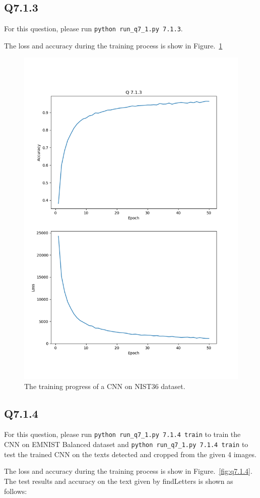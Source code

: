 \documentclass[11pt]{article}
\newcommand{\code}[1]{\texttt{#1}}
\begin{document}
\newpage
\subsection*{Q7.1.3}

For this question, please run \code{python run\_q7\_1.py 7.1.3}.

The loss and accuracy during the training process is show in Figure.~\ref{fig:q7.1.3}

\begin{figure}[h!]
    \centering
    \includegraphics[width=.6\linewidth]{../results/q7_1_3.png}
    \caption{The training progress of a CNN on NIST36 dataset. }
    \label{fig:q7.1.3}
\end{figure}

\newpage
\subsection*{Q7.1.4}

For this question, please run \code{python run\_q7\_1.py 7.1.4 train} to train the CNN on EMNIST Balanced dataset and \code{python run\_q7\_1.py 7.1.4 train} to test the trained CNN on the texts detected and cropped from the given 4 images.

The loss and accuracy during the training process is show in Figure.~\ref{fig:q7.1.4}. The test results and accuracy on the text given by findLetters is shown as follows:
\end{document}
